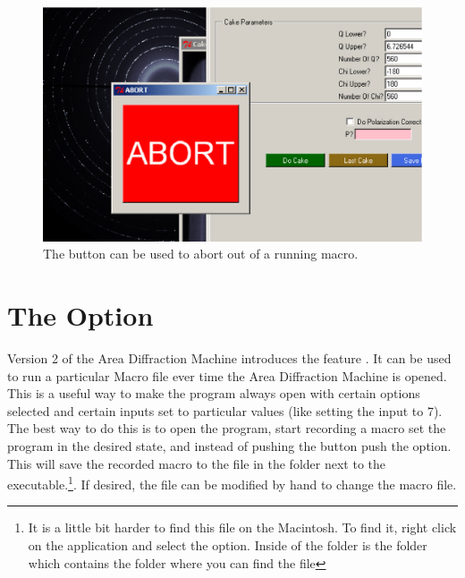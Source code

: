 \begin{figure}
    \centering
    \includegraphics[scale=.75]{figures/abort_button.eps}
    \caption{The  button can be used to abort
    out of a running macro.}
    \label{abort_button}
\end{figure}

\section{\texorpdfstring{The  Option}
    {The ``Set As Initialization'' Option}}
    \label{setAsInitializationSection}

Version 2 of the Area Diffraction Machine introduces the
feature . It can be used to run
a particular Macro file ever time the Area Diffraction Machine
is opened. This is a useful way to make the program always open
with certain options selected and certain inputs set to particular
values (like setting the  input to 7).
The best way to do this is to open the program, start recording a macro
set the program in the desired state, and instead of pushing
the  button push the 
 option. This will save the recorded macro to
the file  in the folder
 next to the executable.\footnote{It
is a little bit harder to find this file on the Macintosh.
To find it, right click on the application and 
select the 
option. Inside of the  folder is the folder 
 which contains the  folder where
you can find the file}. If desired, the 
file can be modified by hand to change the macro file. 

